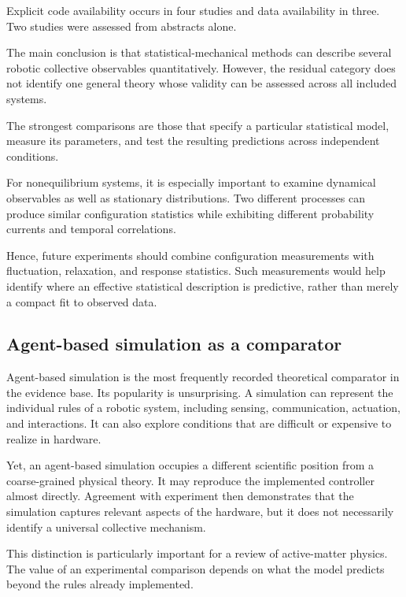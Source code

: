 Explicit code availability
occurs in four studies
and data availability
in three.
Two studies were
assessed from
abstracts alone.

The main conclusion
is that statistical-mechanical
methods can describe
several robotic
collective observables
quantitatively.
However, the residual
category does not
identify one general
theory whose validity
can be assessed
across all
included systems.

The strongest
comparisons are
those that specify
a particular
statistical model,
measure its parameters,
and test the resulting
predictions across
independent conditions.

For nonequilibrium
systems, it is
especially important
to examine dynamical
observables as well
as stationary
distributions.
Two different
processes can
produce similar
configuration
statistics while
exhibiting different
probability currents
and temporal
correlations.

Hence, future
experiments should
combine configuration
measurements with
fluctuation,
relaxation,
and response
statistics.
Such measurements
would help identify
where an effective
statistical description
is predictive,
rather than merely
a compact fit
to observed data.

\subsection{Agent-based simulation as a comparator}
\label{sec:theory-agent-based}

Agent-based simulation is the most frequently
recorded theoretical comparator in the evidence base.
Its popularity is unsurprising. A simulation can
represent the individual rules of a robotic system,
including sensing, communication, actuation,
and interactions. It can also explore conditions
that are difficult or expensive to realize
in hardware.

Yet, an agent-based simulation occupies a
different scientific position from a
coarse-grained physical theory.
It may reproduce the implemented controller
almost directly. Agreement with experiment
then demonstrates that the simulation
captures relevant aspects of the hardware,
but it does not necessarily identify
a universal collective mechanism.

This distinction is particularly important
for a review of active-matter physics.
The value of an experimental comparison
depends on what the model predicts
beyond the rules already implemented.

